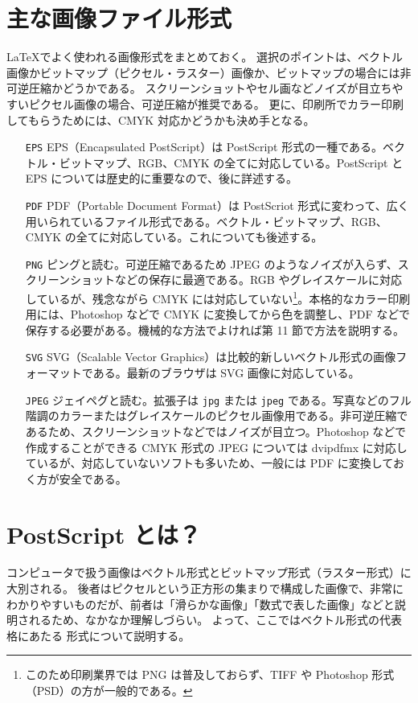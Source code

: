 \section{主な画像ファイル形式}
\LaTeX{}でよく使われる画像形式をまとめておく。
選択のポイントは、ベクトル画像かビットマップ（ピクセル・ラスター）画像か、ビットマップの場合には非可逆圧縮かどうかである。
スクリーンショットやセル画などノイズが目立ちやすいピクセル画像の場合、可逆圧縮が推奨である。
更に、印刷所でカラー印刷してもらうためには、CMYK 対応かどうかも決め手となる。
\begin{itemize}\setlength{\leftskip}{2.00zw}\setlength{\labelsep}{+1.50zw}
\item[{\texttt{EPS}}] EPS（Encapsulated PostScript）は PostScript 形式の一種である。ベクトル・ビットマップ、RGB、CMYK の全てに対応している。PostScript と EPS については歴史的に重要なので、後に詳述する。
\item[{\texttt{PDF}}] PDF（Portable Document Format）は PostScriot 形式に変わって、広く用いられているファイル形式である。ベクトル・ビットマップ、RGB、CMYK の全てに対応している。これについても後述する。
\item[{\texttt{PNG}}] ピングと読む。可逆圧縮であるため JPEG のようなノイズが入らず、スクリーンショットなどの保存に最適である。RGB やグレイスケールに対応しているが、残念ながら CMYK には対応していない\footnote{このため印刷業界では PNG は普及しておらず、TIFF や Photoshop 形式（PSD）の方が一般的である。}。本格的なカラー印刷用には、Photoshop などで CMYK に変換してから色を調整し、PDF などで保存する必要がある。機械的な方法でよければ第 11 節で方法を説明する。\\
\item[{\texttt{SVG}}] SVG（Scalable Vector Graphics）は比較的新しいベクトル形式の画像フォーマットである。最新のブラウザは SVG 画像に対応している。
\item[{\texttt{JPEG}}] ジェイペグと読む。拡張子は \texttt{jpg} または \texttt{jpeg} である。写真などのフル階調のカラーまたはグレイスケールのピクセル画像用である。非可逆圧縮であるため、スクリーンショットなどではノイズが目立つ。Photoshop などで作成することができる CMYK 形式の JPEG については dvipdfmx に対応しているが、対応していないソフトも多いため、一般には PDF に変換しておく方が安全である。
\end{itemize}
\section{PostScript とは？}
コンピュータで扱う画像はベクトル形式とビットマップ形式（ラスター形式）に大別される。
後者はピクセルという正方形の集まりで構成した画像で、非常にわかりやすいものだが、前者は「滑らかな画像」「数式で表した画像」などと説明されるため、なかなか理解しづらい。
よって、ここではベクトル形式の代表格にあたる  形式について説明する。\\

